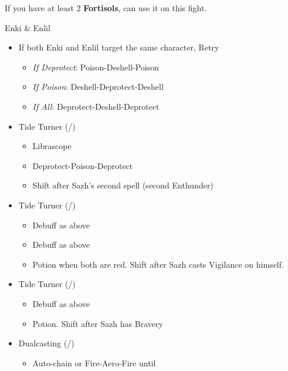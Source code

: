 \begin{paracol}{2}
\renewcommand{\first}{[1] Slash \& Burn (\rav/\com)}
\renewcommand{\second}{[2] Tide Turner (\sab/\syn)}
\renewcommand{\third}{[3] Tide Turner (\sab/\syn)}
\renewcommand{\fourth}{[4] Dualcasting (\rav/\rav)}
\renewcommand{\fifth}{[5] Undermine (\sab/\rav)}
\renewcommand{\sixth}{[6] Divide \& Conquer (\sab/\com)}
\switchcolumn*
If you have at least 2 \textbf{Fortisols}, can use it on this fight.
\begin{battle}{Enki \& Enlil }
	
		\begin{itemize}
			\item If both Enki and Enlil target the same character, Retry

			      \begin{itemize}
				      \item \textit{If Deprotect}: Poison-Deshell-Poison
				      \item \textit{If Poison}: Deshell-Deprotect-Deshell
				      \item \textit{If All}: Deprotect-Deshell-Deprotect
			      \end{itemize}
			\item \second
			      \begin{itemize}
				      \item Librascope
				      \item Deprotect-Poison-Deprotect
				      \item Shift after Sazh's second spell (second Enthunder)
			      \end{itemize}
			\item \third
			      \begin{itemize}
				      \item Debuff as above
				      \item Debuff as above
				      \item Potion when both are red. Shift after Sazh casts Vigilance on himself.
			      \end{itemize}
			\item \second
			      \begin{itemize}
				      \item Debuff as above
				      \item Potion. Shift after Sazh has Bravery
			      \end{itemize}
			\item \fourth
			      \begin{itemize}
				      \item Auto-chain or Fire-Aero-Fire until \stagger

\end{itemize}
\end{itemize}
\end{battle}
\end{paracol}

